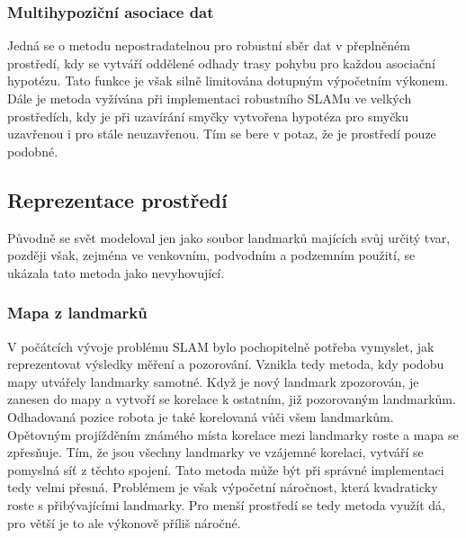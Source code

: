 \documentclass[11pt]{article}
\begin{document}
\subsubsection{Multihypoziční asociace dat}
Jedná se o metodu nepostradatelnou pro robustní sběr dat v přeplněném prostředí, kdy se vytváří oddělené odhady trasy pohybu pro každou asociační hypotézu. Tato funkce je však silně limitována dotupným výpočetním výkonem. Dále je metoda vyžívána při implementaci robustního SLAMu ve velkých prostředích, kdy je při uzavírání smyčky vytvořena hypotéza pro smyčku uzavřenou i pro stále neuzavřenou. Tím se bere v potaz, že je prostředí pouze podobné. 

\newpage
\subsection{Reprezentace prostředí}
Původně se svět modeloval jen jako soubor landmarků majících svůj určitý tvar, později však, zejména ve venkovním, podvodním a podzemním použití, se ukázala tato metoda jako nevyhovující.\\

\subsubsection{Mapa z landmarků}
V počátcích vývoje problému SLAM bylo pochopitelně potřeba vymyslet, jak reprezentovat výsledky měření a pozorování. Vznikla tedy metoda, kdy podobu mapy utvářely landmarky samotné. Když je nový landmark zpozorován, je zanesen do mapy a vytvoří se korelace k ostatním, již pozorovaným landmarkům. Odhadovaná pozice robota je také korelovaná vůči všem landmarkům. \\
\indent Opětovným projížděním známého místa korelace mezi landmarky roste a mapa se zpřesňuje. Tím, že jsou všechny landmarky ve vzájemné korelaci, vytváří se pomyslná síť z těchto spojení. Tato metoda může být při správné implementaci tedy velmi přesná. Problémem je však výpočetní náročnost, která kvadraticky roste s přibývajícími landmarky. Pro menší prostředí se tedy metoda využít dá, pro větší je to ale výkonově příliš náročné.
\end{document}
